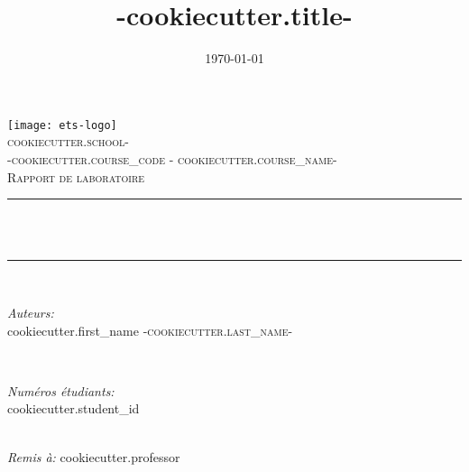 \documentclass[10pt, onside]{article}
\title{ {{-cookiecutter.title-}} }
\author{}
\date{\today}
\makeatletter
\let\thetitle\@title
\let\thedate\@date
\def \course { {{-cookiecutter.course_code}} - {{cookiecutter.course_name-}} }
\renewcommand*{\cleardoublepage}{\clearpage\if@twoside \ifodd\c@page\else
\hbox{}%
\thispagestyle{empty}%
\newpage%
\if@twocolumn\hbox{}\newpage\fi\fi\fi}
\makeatother
\begin{document}
\begin{titlepage}
  \centering
    \vspace*{0.5 cm}
    \texttt{[image: ets-logo]}\\[1.0 cm]	%
    \textsc{ \LARGE {{cookiecutter.school-}} }\\[2.0 cm]	%
  \textsc{\Large \course}\\[0.5 cm]				%
  \textsc{\large Rapport de laboratoire}\\[0.5 cm]				%
  \rule{\linewidth}{0.2 mm} \\[0.4 cm]
  { \huge \bfseries \thetitle}\\
  \rule{\linewidth}{0.2 mm} \\[1.5 cm]

  \begin{minipage}{0.4\textwidth}
    \begin{flushleft}
      \emph{Auteurs:}\\
      {{cookiecutter.first_name}} \textsc{ {{-cookiecutter.last_name-}} }\\
      \end{flushleft}
      \end{minipage}~
      \begin{minipage}{0.4\textwidth}
      \begin{flushright}
      \emph{Numéros étudiants:} \\
      {{cookiecutter.student_id}}	\\
    \end{flushright}
  \end{minipage}\\[2 cm]

  \emph{Remis à:} {{cookiecutter.professor}}\\
  {\thedate}\\[2 cm]
\end{titlepage}

\cleardoublepage

\tableofcontents


\end{document}
